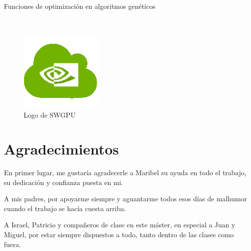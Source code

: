 \begin{center}
{\LARGE\bfseries\titulo}\\
\end{center}

\begin{center}
	Funciones de optimización en algoritmos genéticos
\end{center}

\begin{center}
	\autor\
\end{center}


\begin{figure}[h]
\centering
\includegraphics[width=0.2\linewidth]{../images/logo_swgpu}
\caption[Logo de SWGPU]{Logo de SWGPU}
\label{fig:logo}
\end{figure}

\newpage
\textcolor{white}{}
\newpage

\chapter*{Agradecimientos}

En primer lugar, me gustaría agradecerle  a Maribel su ayuda en todo el trabajo, su dedicación y confianza puesta en mi. 

\bigskip
A mis padres, por apoyarme siempre y aguantarme todos esos días de malhumor cuando el trabajo se hacía cuesta arriba.

\bigskip
A Israel, Patricio y compañeros de clase en este máster, en especial a Juan y Miguel, por estar siempre dispuestos a todo, tanto dentro de las clases como fuera.

\newpage
\textcolor{white}{}
\newpage
